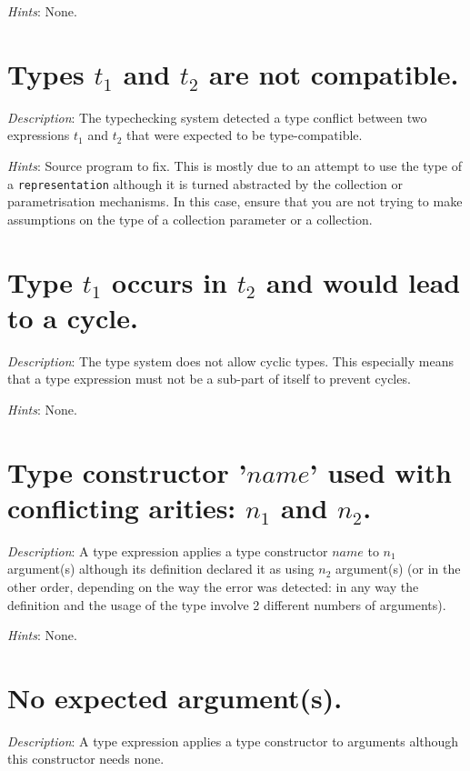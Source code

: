 {\em Hints}: None.



\section*{Types $t_1$ and $t_2$ are not compatible.}
{\em Description}: The typechecking system detected a type conflict
between two expressions $t_1$ and $t_2$ that were expected to be
type-compatible.

{\em Hints}: Source program to fix. This is mostly due to an attempt
to use the type of a {\tt representation} although it is turned
abstracted by the collection or parametrisation mechanisms. In this
case, ensure that you are not trying to make assumptions on the type
 of a collection parameter or a collection.



\section*{Type $t_1$ occurs in $t_2$ and would lead to a cycle.}
{\em Description}: The {\focal} type system does not allow cyclic
types. This especially means that a type expression must not be a
sub-part of itself to prevent cycles.

{\em Hints}: None.



\section*{Type constructor '$name$' used with conflicting arities:
  $n_1$ and $n_2$.}
{\em Description}: A type expression applies a type constructor $name$
to $n_1$ argument(s) although its definition declared it as using $n_2$
argument(s) (or in the other order, depending on the way the error was
detected: in any way the definition and the usage of the type involve
2 different numbers of arguments).

{\em Hints}: None.



\section*{No expected argument(s).}
{\em Description}: A type expression applies a type constructor to
arguments although this constructor needs none.


